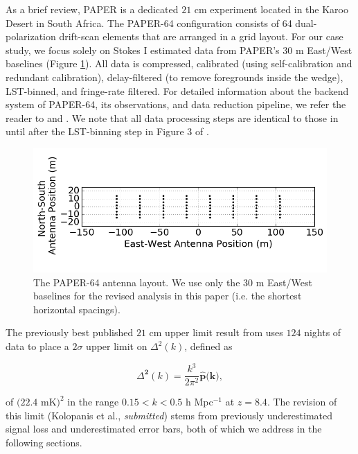 \documentclass[preprint2,numberedappendix,tighten]{aastex6}  %
\begin{document}
As a brief review, PAPER is a dedicated $21$ cm experiment located in the Karoo Desert in South Africa. The PAPER-64 
configuration consists of 64 dual-polarization drift-scan elements that are arranged in a grid layout. For our case study, we 
focus solely on Stokes I estimated data \citep{moore_et_al2013} from PAPER's $30$ m East/West baselines (Figure 
\ref{fig:ant_layout}). All data is compressed, calibrated (using self-calibration and redundant calibration), delay-filtered (to remove foregrounds inside the wedge), LST-binned, and fringe-rate filtered. For detailed information about the backend system of PAPER-64, its observations, and data reduction pipeline, we 
refer the reader to \citet{parsons_et_al2010} and . We note that all data processing steps are identical to those in  until after the LST-binning step in Figure 3 of .

\begin{figure}
	\centering
	\includegraphics[trim={0cm 0cm 0cm 0cm},width=\columnwidth]{plots/ant_layout_aspect.png}
	\caption{The PAPER-64 antenna layout. We use only the $30$ m East/West baselines for the revised analysis in this 
paper (i.e. the shortest horizontal spacings).}
	\label{fig:ant_layout}
\end{figure}

The previously best published $21$ cm upper limit result from  uses $124$ nights of data to place a $2\sigma$ upper limit 
on $\Delta^{2}(k)$, defined as

\begin{equation}
\Delta^{\textbf{2}}(k) = \frac{k^{3}}{2\pi^{2}}\widehat{\textbf{p}}\textbf{(k)},
\end{equation}

\noindent of $(22.4$ mK$)^{2}$ in the range $0.15 < k < 0.5$ h Mpc$^{-1}$ at $z = 8.4$. The revision of this limit (Kolopanis et al., \textit{submitted}) stems from previously underestimated signal loss and underestimated error bars, both of which we 
address in the following sections. 
\end{document}
